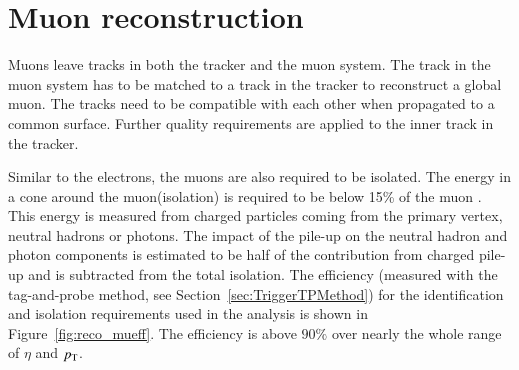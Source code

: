 \section{Muon reconstruction}
\label{sec:SimReco_Mu}


Muons leave tracks in both the tracker and the muon system. The track in the muon system has to be matched to a track in the tracker to reconstruct a global muon.
The tracks need to be compatible with each other when propagated to a common surface.
Further quality requirements are applied to the inner track in the tracker.

Similar to the electrons, the muons are also required to be isolated. The energy in a cone around the muon(isolation) is required to be below 15\% of the muon \pt.
This energy is measured from charged particles coming from the primary vertex, neutral hadrons or photons. The impact of the pile-up on the neutral hadron and photon components
is estimated to be half of the contribution from charged pile-up and is subtracted from the total isolation.
The efficiency (measured with the tag-and-probe method, see Section~\ref{sec:TriggerTPMethod}) for the identification and isolation requirements used in the analysis is shown in Figure~\ref{fig:reco_mueff}.
The efficiency is above $90\%$ over nearly the whole range of $\eta$ and $p_{\mathrm{T}}$.


